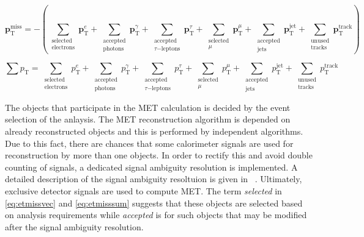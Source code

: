 \begin{equation}
    \boldsymbol{p}_\text{T}^{\text{miss}} = - \left( 
    \sum_{\substack{\mathrm{selected} \\ \mathrm{electrons}}} \boldsymbol{p}_\text{T}^e + 
    \sum_{\substack{\mathrm{accepted} \\ \mathrm{photons}}} \boldsymbol{p}_\text{T}^\gamma + 
    \sum_{\substack{\mathrm{accepted} \\ \tau \mathrm{-leptons}}} \boldsymbol{p}_\text{T}^\tau + 
    \sum_{\substack{\mathrm{selected} \\ \mu}} \boldsymbol{p}_\text{T}^\mu + 
    \sum_{\substack{\mathrm{accepted} \\ \mathrm{jets}}} \boldsymbol{p}_\text{T}^{\text{jet}} + 
    \sum_{\substack{\mathrm{unused} \\ \mathrm{tracks}}} \boldsymbol{p}_\text{T}^{\mathrm{track}} \right)
    \label{eq:etmissvec}    
\end{equation}

\begin{equation}
    \sum p_\text{T} = 
    \sum_{\substack{\mathrm{selected} \\ \mathrm{electrons}}} p_\text{T}^e + 
    \sum_{\substack{\mathrm{accepted} \\ \mathrm{photons}}} p_\text{T}^\gamma + 
    \sum_{\substack{\mathrm{accepted} \\ \tau \mathrm{-leptons}}} p_\text{T}^\tau + 
    \sum_{\substack{\mathrm{selected} \\ \mu}} p_\text{T}^\mu + 
    \sum_{\substack{\mathrm{accepted} \\ \mathrm{jets}}} p_\text{T}^{\text{jet}} + 
    \sum_{\substack{\mathrm{unused} \\ \mathrm{tracks}}} p_\text{T}^{\mathrm{track}}
    \label{eq:etmisssum}    
\end{equation}

The objects that participate in the MET calculation is decided by the event selection of the anlaysis. The MET reconstruction algorithm is depended on already reconstructed
objects and this is performed by independent algorithms. Due to this fact, there are chances that some calorimeter signals are used for reconstruction by more than one
objects. In order to rectify this and avoid double counting of signals, a dedicated signal ambiguity resolution is implemented. 
A detailed description of the signal ambiguity resoltuion is given in ~\cite{ATLAS:2024cmj}.
Ultimately, exclusive detector signals are used to compute MET. The term \textit{selected} in \cref{eq:etmissvec} and \cref{eq:etmisssum} suggests 
that these objects are selected based on analysis requirements while \textit{accepted} 
is for such objects that may be modified after the signal ambiguity resolution. 




